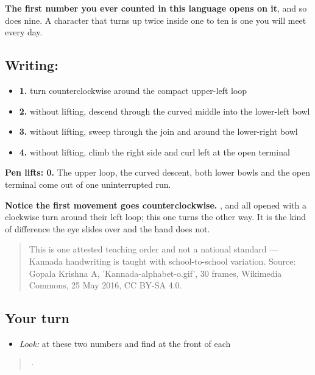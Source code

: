 \textbf{The first number you ever counted in this language opens on it}, and so does nine. A character that turns up twice inside one to ten is one you will meet every day.

\subsection*{Writing: }

\begin{itemize}
\raggedright
  \item \textbf{1.} turn counterclockwise around the compact upper-left loop
  \item \textbf{2.} without lifting, descend through the curved middle into the lower-left bowl
  \item \textbf{3.} without lifting, sweep through the join and around the lower-right bowl
  \item \textbf{4.} without lifting, climb the right side and curl left at the open terminal
\end{itemize}

\textbf{Pen lifts: 0.} The upper loop, the curved descent, both lower bowls and the open terminal come out of one uninterrupted run.

\textbf{Notice the first movement goes counterclockwise.} ,  and  all opened with a clockwise turn around their left loop; this one turns the other way. It is the kind of difference the eye slides over and the hand does not.

\begin{quote}
This is one attested teaching order and not a national standard — Kannada handwriting is taught with school-to-school variation. Source: Gopala Krishna A, 'Kannada-alphabet-o.gif', 30 frames, Wikimedia Commons, 25 May 2016, CC BY-SA 4.0.
\end{quote}

\subsection*{Your turn}
\begin{itemize}
\raggedright
  \item \emph{Look:} at these two numbers and find  at the front of each
\end{itemize}

\begin{quote}
  ·  
\end{quote}

